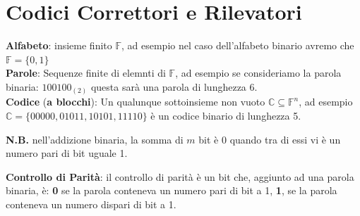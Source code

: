 \section{Codici Correttori e Rilevatori}

\begin{flushleft}
    \textbf{Alfabeto}: insieme finito $\mathbb{F}$, ad esempio nel caso dell'alfabeto binario avremo che $\mathbb{F} = \{0, 1\}$ \\
    \textbf{Parole}: Sequenze finite di elemnti di $\mathbb{F}$, ad esempio se consideriamo la parola binaria: $100100_{(2)}$ questa sarà una parola di lunghezza 6. \\
    \textbf{Codice} (\textbf{a blocchi}): Un qualunque sottoinsieme non vuoto $\mathbb{C} \subseteq \mathbb{F}^n$, ad esempio $\mathbb{C} = \{00000, 01011, 10101, 11110\}$ è un codice binario di lunghezza 5. \newline

    \textbf{N.B.} nell'addizione binaria, la somma di $m$ bit è 0 quando tra di essi vi è un numero pari di bit uguale 1.

    \textbf{Controllo di Parità}: il controllo di parità è un bit che, aggiunto ad una parola binaria, è: \textbf{0} se la parola conteneva un numero pari di bit a 1, \textbf{1}, se la parola conteneva un numero dispari di bit a 1.
\end{flushleft}


